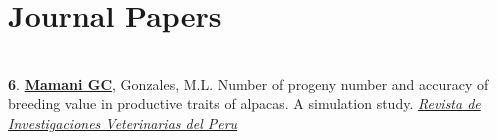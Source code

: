 \documentclass[margin,line,10pt]{res}
\newenvironment{list1}{
  \begin{list}{\ding{113}}{%
      \setlength{\itemsep}{0in}
      \setlength{\parsep}{0in} \setlength{\parskip}{0in}
      \setlength{\topsep}{0in} \setlength{\partopsep}{0in} 
      \setlength{\leftmargin}{0.17in}}}{\end{list}}
\begin{document}
\begin{resume}
% 
% 
% 
% 
% 
% 
% 

\vspace{0.7cm}
\section{\sc Journal Papers}
\vspace{0.9cm}


\section{}

\begin{list1}
\item [{\bf 6}.] {\bf \underline{Mamani GC}}, Gonzales, M.L. Number of progeny number and accuracy of breeding value in productive traits of alpacas. A simulation study. 
\textcolor{blue}{\href{https://revistasinvestigacion.unmsm.edu.pe/index.php/veterinaria/article/view/19083}{{\it Revista de Investigaciones Veterinarias del Peru } }}
\end{list1}


\end{resume}
\end{document}
